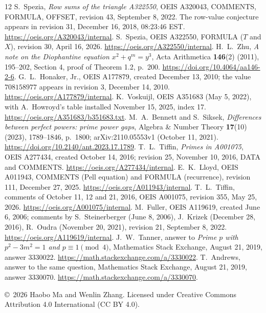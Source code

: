 \documentclass[11pt]{article}
\begin{document}
\begin{thebibliography}{12}
 S.~Spezia, \emph{Row sums of the triangle A322550},
OEIS A320043, COMMENTS, FORMULA, OFFSET, revision 43,
September 8, 2022. The row-value conjecture appears in revision 31,
December 16, 2018, 08:23:46 EST.
\url{https://oeis.org/A320043/internal}.
 S.~Spezia, OEIS A322550,
FORMULA ($T$ and $X$), revision 30, April 16, 2026.
\url{https://oeis.org/A322550/internal}.
 H.~L.~Zhu, \emph{A note on the Diophantine equation
$x^2+q^m=y^3$}, Acta Arithmetica \textbf{146}(2) (2011), 195--202,
Section 4, proof of Theorem 1.2, p.~200.
\url{https://doi.org/10.4064/aa146-2-6}.
 G.~L.~Honaker, Jr., OEIS A177879, created
December 13, 2010; the value $708158977$ appears in revision 3,
December 14, 2010. \url{https://oeis.org/A177879/internal}.
 K.~Voskuijl, OEIS A351683 (May 5, 2022),
with A.~Howroyd's table installed November 15, 2025, index 17.
\url{https://oeis.org/A351683/b351683.txt}.
 M.~A.~Bennett and S.~Siksek,
\emph{Differences between perfect powers: prime power gaps},
Algebra \& Number Theory \textbf{17}(10) (2023), 1789--1846,
p.~1800; arXiv:2110.05553v1 (October 11, 2021).
\url{https://doi.org/10.2140/ant.2023.17.1789}.
 T.~L.~Tiffin, \emph{Primes in A001075},
OEIS A277434, created October 14, 2016; revision 25,
November 10, 2016, DATA and COMMENTS.
\url{https://oeis.org/A277434/internal}.
 E.~K.~Lloyd, OEIS A011943,
COMMENTS (Pell equation) and FORMULA (recurrence),
revision 111, December 27, 2025.
\url{https://oeis.org/A011943/internal}.
 T.~L.~Tiffin, comments of October 11, 12 and 21, 2016,
OEIS A001075, revision 355, May 25, 2026.
\url{https://oeis.org/A001075/internal}.
 M.~Fuller, OEIS A119619, created June 6, 2006;
comments by S.~Steinerberger (June 8, 2006), J.~Krizek (December 28, 2016),
R.~Oudra (November 20, 2021),
revision 21, September 8, 2022.
\url{https://oeis.org/A119619/internal}.
 J.~W.~Tanner, answer to
\emph{Prime $p$ with $p^2-3m^2=1$ and $p\equiv1\pmod4$},
Mathematics Stack Exchange, August 21, 2019, answer 3330022.
\url{https://math.stackexchange.com/a/3330022}.
 T.~Andrews, answer to the same question,
Mathematics Stack Exchange, August 21, 2019, answer 3330070.
\url{https://math.stackexchange.com/a/3330070}.
\end{thebibliography}
\medskip\noindent\small
\copyright\ 2026 Haobo Ma and Wenlin Zhang.
Licensed under Creative Commons Attribution 4.0 International (CC BY 4.0).
\end{document}
